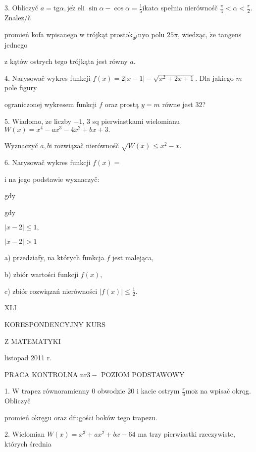 \documentclass[a4paper,12pt]{article}
\begin{document}
3. Obliczyč $a=\mathrm{t}\mathrm{g}\alpha, \mathrm{j}\mathrm{e}\dot{\mathrm{z}}$ eli $\displaystyle \sin\alpha-\cos\alpha=\frac{1}{5}\mathrm{i}\mathrm{k}\mathrm{a}\mathrm{t}\alpha$ spełnia nierównośč $\displaystyle \frac{\pi}{4}<\alpha<\frac{\pi}{2}$. Znalez/č

promień kofa wpisanego $\mathrm{w}$ trójkąt $\mathrm{p}\mathrm{r}\mathrm{o}\mathrm{s}\mathrm{t}\mathrm{o}\mathrm{k}_{\Phi^{\mathrm{t}}}\mathrm{n}\mathrm{y}\mathrm{o}$ polu $ 25\pi$, wiedząc, $\dot{\mathrm{z}}\mathrm{e}$ tangens jednego

$\mathrm{z}$ kątów ostrych tego trójkąta jest równy $a.$

4. Narysowač wykres funkcji $f(x) =2|x-1|-\sqrt{x^{2}+2x+1}$. Dla jakiego $m$ pole figury

ograniczonej wykresem funkcji $f$ oraz prostą $y=m$ równe jest 32?

5. Wiadomo, $\dot{\mathrm{z}}\mathrm{e}$ liczby $-1$, 3 sq pierwiastkami wielomianu $W(x)=x^{4}-ax^{3}-4x^{2}+bx+3.$

Wyznaczyč $a, b\mathrm{i}$ rozwiązač nierównośč $\sqrt{W(x)}\leq x^{2}-x.$

6. Narysowač wykres funkcji $f(x)=$

$\mathrm{i}$ na jego podstawie wyznaczyč:

gdy

gdy

$|x-2|\leq 1,$

$|x-2|>1$

a) przedziafy, na których funkcja $f$ jest malejąca,

b) zbiór wartości funkcji $f(x),$

c) zbiór rozwiązań nierówności $|f(x)|\displaystyle \leq\frac{1}{2}.$





XLI

KORESPONDENCYJNY KURS

Z MATEMATYKI

listopad 2011 r.

PRACA KONTROLNA $\mathrm{n}\mathrm{r} 3-$ POZIOM PODSTAWOWY

1. $\mathrm{W}$ trapez równoramienny $0$ obwodzie 20 $\mathrm{i}$ kacie ostrym $\displaystyle \frac{\pi}{6}\mathrm{m}\mathrm{o}\dot{\mathrm{z}}$ na wpisač okrqg. Obliczyč

promień okręgu oraz dfugości boków tego trapezu.

2. Wielomian $W(x)=x^{3}+ax^{2}+bx-64$ ma trzy pierwiastki rzeczywiste, których średnia
\end{document}
